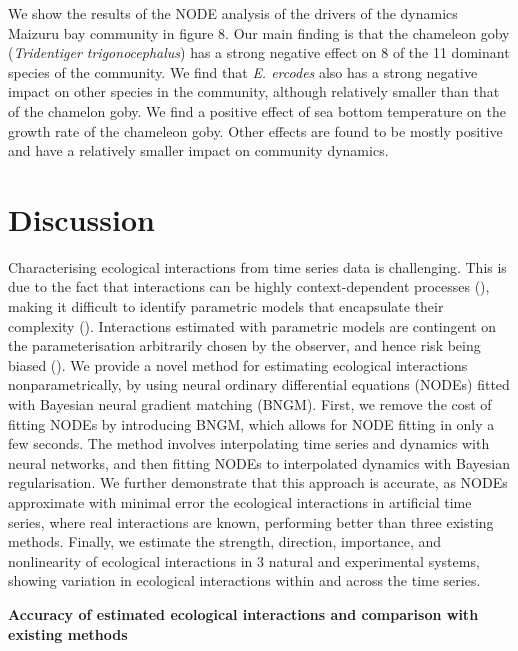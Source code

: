 \documentclass[11pt, oneside]{article}
\begin{document}
We show the results of the NODE analysis of the drivers of the dynamics Maizuru bay community in figure 8.
Our main finding is that the chameleon goby (\textit{Tridentiger trigonocephalus}) has a strong negative effect on 8 of the 11 dominant species of the community. 
We find that \textit{E. ercodes} also has a strong negative impact on other species in the community, although relatively smaller than that of the chamelon goby.
We find a positive effect of sea bottom temperature on the growth rate of the chameleon goby.
Other effects are found to be mostly positive and have a relatively smaller impact on community dynamics.

\section{Discussion}

Characterising ecological interactions from time series data is challenging.
This is due to the fact that interactions can be highly context-dependent processes (\cite{Song2021}), making it difficult to identify parametric models that encapsulate their complexity (\cite{Wood2001}).
Interactions estimated with parametric models are contingent on the parameterisation arbitrarily chosen by the observer, and hence risk being biased (\cite{Wood2001,Adamson2013}).
We provide a novel method for estimating ecological interactions nonparametrically, by using neural ordinary differential equations (NODEs) fitted with Bayesian neural gradient matching (BNGM). 
First, we remove the cost of fitting NODEs by introducing BNGM, which allows for NODE fitting in only a few seconds. 
The method involves interpolating time series and dynamics with neural networks, and then fitting NODEs to interpolated dynamics with Bayesian regularisation.
We further demonstrate that this approach is accurate, as NODEs approximate with minimal error the ecological interactions in artificial time series, where real interactions are known, performing better than three existing methods. 
Finally, we estimate the strength, direction, importance, and nonlinearity of ecological interactions in 3 natural and experimental systems, showing variation in ecological interactions within and across the time series.

\textbf{Accuracy of estimated ecological interactions and comparison with existing methods}
\end{document}
